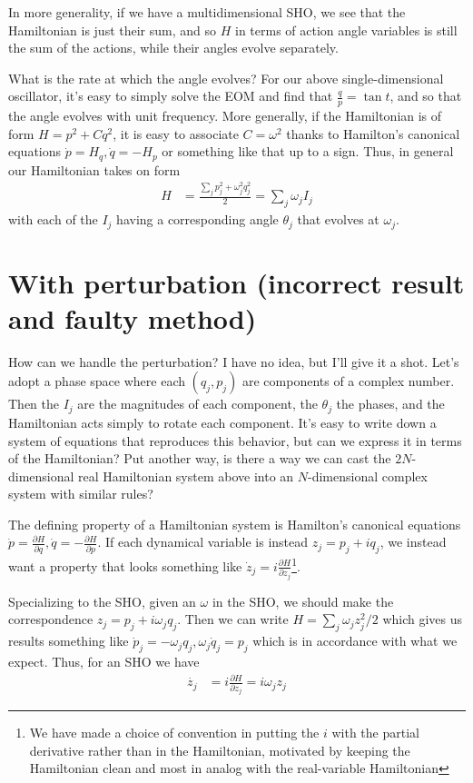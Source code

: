 \documentclass[12pt]{report}
\newcommand{\pd}[2]{\frac{\partial#1}{\partial#2}}
\begin{document}
In more generality, if we have a multidimensional SHO, we see that the
Hamiltonian is just their sum, and so $H$ in terms of action angle variables is
still the sum of the actions, while their angles evolve separately.

What is the rate at which the angle evolves? For our above single-dimensional
oscillator, it's easy to simply solve the EOM and find that $\frac{q}{p} = \tan
t$, and so that the angle evolves with unit frequency. More generally, if the
Hamiltonian is of form $H = p^2 + Cq^2$, it is easy to associate $C = \omega^2$
thanks to Hamilton's canonical equations $\dot{p} = H_q, \dot{q} = -H_p$ or
something like that up to a sign. Thus, in general our Hamiltonian takes on form
\begin{align}
    H &= \frac{\sum_j p_j^2 + \omega_j^2q_j^2}{2} = \sum_j \omega_j I_j
\end{align}
with each of the $I_j$ having a corresponding angle $\theta_j$ that evolves at
$\omega_j$.

\section{With perturbation (incorrect result and faulty method)}

How can we handle the perturbation? I have no idea, but I'll give it a shot.
Let's adopt a phase space where each $(q_j, p_j)$ are components of a complex
number. Then the $I_j$ are the magnitudes of each component, the $\theta_j$ the
phases, and the Hamiltonian acts simply to rotate each component. It's easy to
write down a system of equations that reproduces this behavior, but can we
express it in terms of the Hamiltonian? Put another way, is there a way we can
cast the $2N$-dimensional real Hamiltonian system above into an $N$-dimensional
complex system with similar rules?

The defining property of a Hamiltonian system is Hamilton's canonical equations
$\dot{p} = \pd{H}{q}, \dot{q} = -\pd{H}{p}$. If each dynamical variable is
instead $z_j = p_j + iq_j$, we instead want a property that looks something like
$\dot{z}_j = i\pd{H}{z_j}$\footnote{We have made a choice of convention in
putting the $i$ with the partial derivative rather than in the Hamiltonian,
motivated by keeping the Hamiltonian clean and most in analog with the
real-variable Hamiltonian}.

Specializing to the SHO, given an $\omega$ in the SHO, we should make the
correspondence $z_j = p_j + i\omega_jq_j$. Then we can write $H = \sum_j
\omega_j z_j^2/2$ which gives us results something like
$\dot{p}_j = -\omega_jq_j, \omega_j\dot{q}_j = p_j$ which is in accordance with
what we expect. Thus, for an SHO we have
\begin{align}
    \dot{z_j} &= i\pd{H}{z_j} = i\omega_jz_j
\end{align}
\end{document}
